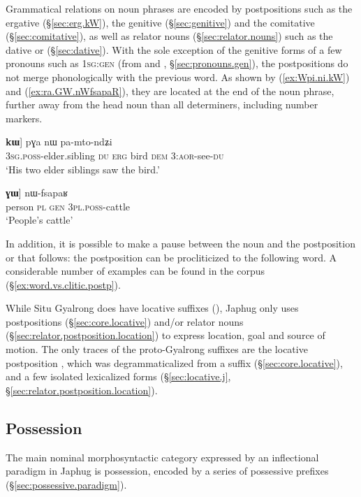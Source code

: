 Grammatical relations on noun phrases are encoded by postpositions such as the ergative  (§\ref{sec:erg.kW}), the genitive  (§\ref{sec:genitive}) and the comitative  (§\ref{sec:comitative}), as well as relator nouns (§\ref{sec:relator.nouns}) such as the dative  or  (§\ref{sec:dative}). With the sole exception of the genitive forms of a few pronouns such as  \textsc{1sg}:\textsc{gen} (from  and , §\ref{sec:pronouns.gen}), the postpositions do not merge phonologically with the previous word. As shown by (\ref{ex:Wpi.ni.kW}) and (\ref{ex:ra.GW.nWfsapaR}), they are located at the end of the noun phrase, further away from the head noun than all determiners, including number markers. 

\begin{exe}
\ex \label{ex:Wpi.ni.kW}
\gll [[ɯ-pi ni] \textbf{kɯ}] pɣa nɯ pa-mto-ndʑi\\
\textsc{3sg}.\textsc{poss}-elder.sibling \textsc{du} \textsc{erg} bird \textsc{dem} 3\flobv{}:\textsc{aor}-see-\textsc{du} \\
\glt `His two elder siblings saw the bird.' 
\end{exe}

\begin{exe}
\ex \label{ex:ra.GW.nWfsapaR}
\gll [[tɯrme ra] \textbf{ɣɯ}] nɯ-fsapaʁ \\
person \textsc{pl} \textsc{gen} \textsc{3pl}.\textsc{poss}-cattle \\
\glt `People's cattle' 
\end{exe}

In addition, it is possible to make a pause between the noun and the postposition  or  that follows: the postposition can be procliticized to the following word. A considerable number of examples can be found in the corpus (§\ref{ex:word.vs.clitic.postp}).

While Situ Gyalrong does have locative suffixes (\citealt[325--331]{linxr93jiarong}), Japhug only uses postpositions (§\ref{sec:core.locative}) and/or relator nouns (§\ref{sec:relator.postposition.location}) to express location, goal and source of motion. The only traces of the proto-Gyalrong suffixes are the locative postposition , which was degrammaticalized from a suffix  (§\ref{sec:core.locative}), and a few isolated lexicalized forms (§\ref{sec:locative.j}, §\ref{sec:relator.postposition.location}).

\subsection{Possession}
The main nominal morphosyntactic category expressed by an inflectional paradigm in Japhug is possession, encoded by a series of possessive prefixes  (§\ref{sec:possessive.paradigm}).


